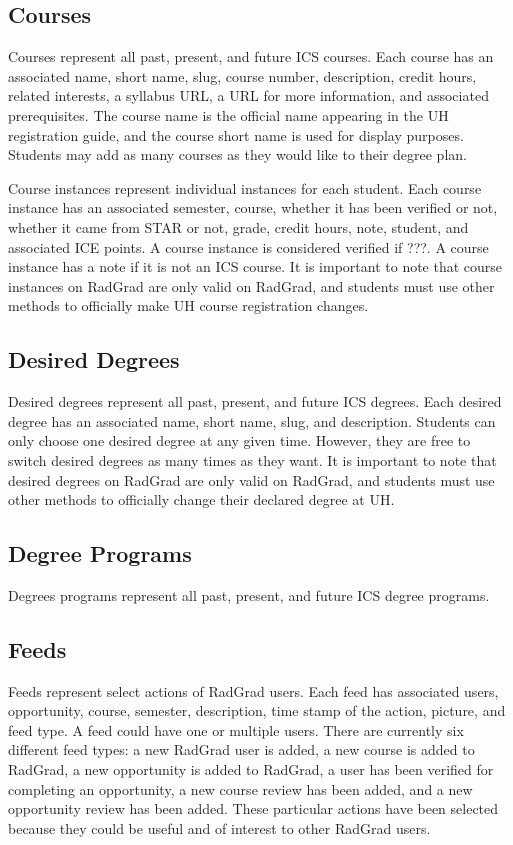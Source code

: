 \subsection{Courses}
Courses represent all past, present, and future ICS courses. Each course has an associated name, short name, slug, course number, description, credit hours, related interests, a syllabus URL, a URL for more information, and associated prerequisites. The course name is the official name appearing in the UH registration guide, and the course short name is used for display purposes. Students may add as many courses as they would like to their degree plan. 

Course instances represent individual instances for each student. Each course instance has an associated semester, course, whether it has been verified or not, whether it came from STAR or not, grade, credit hours, note, student, and associated ICE points. A course instance is considered verified if ???. A course instance has a note if it is not an ICS course. It is important to note that course instances on RadGrad are only valid on RadGrad, and students must use other methods to officially make UH course registration changes.

\subsection{Desired Degrees}
Desired degrees represent all past, present, and future ICS degrees. Each desired degree has an associated name, short name, slug, and description. Students can only choose one desired degree at any given time. However, they are free to switch desired degrees as many times as they want. It is important to note that desired degrees on RadGrad are only valid on RadGrad, and students must use other methods to officially change their declared degree at UH. 

\subsection{Degree Programs}
Degrees programs represent all past, present, and future ICS degree programs.

\subsection{Feeds}
Feeds represent select actions of RadGrad users. Each feed has associated users, opportunity, course, semester, description, time stamp of the action, picture, and feed type. A feed could have one or multiple users. There are currently six different feed types: a new RadGrad user is added, a new course is added to RadGrad, a new opportunity is added to RadGrad, a user has been verified for completing an opportunity, a new course review has been added, and a new opportunity review has been added. These particular actions have been selected because they could be useful and of interest to other RadGrad users.

